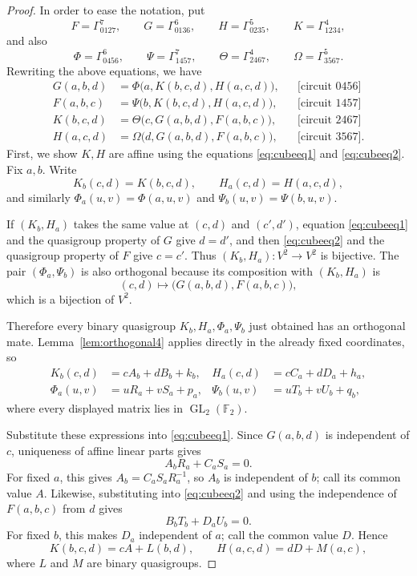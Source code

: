 \documentclass[preprint,12pt]{elsarticle}
\theoremstyle{definition}
\newcommand{\F}{\mathbb F}
\newcommand{\GL}{\operatorname{GL}}
\newcommand{\circuittag}[1]{\text{[circuit $#1$]}}
\begin{document}
\begin{proof}
In order to ease the notation, put
\[
F=\Gamma_{0127}^{7},\qquad G=\Gamma_{0136}^{6},\qquad
H=\Gamma_{0235}^{5},\qquad K=\Gamma_{1234}^{4},
\]
and also
\[
\Phi=\Gamma_{0456}^{6},\qquad \Psi=\Gamma_{1457}^{7},\qquad
\Theta=\Gamma_{2467}^{4},\qquad \Omega=\Gamma_{3567}^{5}.
\]
Rewriting the above equations, we have
\begin{align}
	G(a,b,d)&=\Phi\bigl(a,K(b,c,d),H(a,c,d)\bigr), &&\circuittag{0456}\label{eq:cubeeq1}\\
	F(a,b,c)&=\Psi\bigl(b,K(b,c,d),H(a,c,d)\bigr), &&\circuittag{1457}\label{eq:cubeeq2}\\
	K(b,c,d)&=\Theta\bigl(c,G(a,b,d),F(a,b,c)\bigr), &&\circuittag{2467}\label{eq:cubeeq3}\\
	H(a,c,d)&=\Omega\bigl(d,G(a,b,d),F(a,b,c)\bigr), &&\circuittag{3567}.\label{eq:cubeeq4}
\end{align}
First, we show $K,H$ are affine using the equations \eqref{eq:cubeeq1} and \eqref{eq:cubeeq2}. Fix $a,b$. Write
\[
K_b(c,d)=K(b,c,d),\qquad H_a(c,d)=H(a,c,d),
\]
and similarly $\Phi_a(u,v)=\Phi(a,u,v)$ and $\Psi_b(u,v)=\Psi(b,u,v)$.

If $(K_b,H_a)$ takes the same value at $(c,d)$ and $(c',d')$, equation \eqref{eq:cubeeq1} and the quasigroup property of $G$ give $d=d'$, and then \eqref{eq:cubeeq2} and the quasigroup property of $F$ give $c=c'$. Thus $(K_b,H_a):V^2\to V^2$ is bijective. The pair $(\Phi_a,\Psi_b)$ is also orthogonal because its composition with $(K_b,H_a)$ is
\[
(c,d)\longmapsto\bigl(G(a,b,d),F(a,b,c)\bigr),
\]
which is a bijection of $V^2$.

Therefore every binary quasigroup $K_b,H_a,\Phi_a,\Psi_b$ just obtained has an orthogonal mate. Lemma~\ref{lem:orthogonal4} applies directly in the already fixed coordinates, so
\begin{align*}
K_b(c,d)&=cA_b+dB_b+k_b,&
H_a(c,d)&=cC_a+dD_a+h_a,\\
\Phi_a(u,v)&=uR_a+vS_a+p_a,&
\Psi_b(u,v)&=uT_b+vU_b+q_b,
\end{align*}
where every displayed matrix lies in $\GL_2(\F_2)$.

Substitute these expressions into \eqref{eq:cubeeq1}. Since $G(a,b,d)$ is independent of $c$, uniqueness of affine linear parts gives
\[
A_bR_a+C_aS_a=0.
\]
For fixed $a$, this gives $A_b=C_aS_aR_a^{-1}$, so $A_b$ is independent of $b$; call its common value $A$. Likewise, substituting into \eqref{eq:cubeeq2} and using the independence of $F(a,b,c)$ from $d$ gives
\[
B_bT_b+D_aU_b=0.
\]
For fixed $b$, this makes $D_a$ independent of $a$; call the common value $D$. Hence
\[
K(b,c,d)=cA+L(b,d),\qquad H(a,c,d)=dD+M(a,c),
\]
where $L$ and $M$ are binary quasigroups.


\end{proof}
\end{document}
